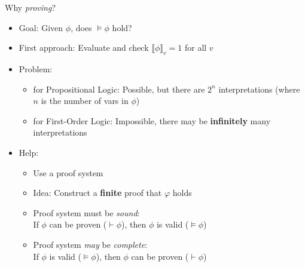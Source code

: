 \begin{frame}{Why \textit{proving}?}
\begin{itemize}
	\item Goal: Given $\phi$, does $\vDash \phi$ hold?
	\item First approach:
	Evaluate and check $\llbracket \phi \rrbracket_v = 1$ for all $v$

	\pause

	\item Problem:
	\begin{itemize}
		\item for Propositional Logic: Possible, but there are $2^n$ interpretations (where $n$ is the number of vars in $\phi$)
		\item for First-Order Logic: Impossible, there may be \textbf{infinitely} many interpretations
	\end{itemize}

	\pause

	\item Help:
	\begin{itemize}
		\item Use a proof system
		\item Idea: Construct a \textbf{finite} proof that $φ$ holds\\[1em]
		\item Proof system must be \textit{sound}: \\
		If $\phi$ can be proven ($\vdash \phi$), then $\phi$ is valid \hspace{3.1em}($\vDash \phi$)\\[1em]
		\item Proof system \textit{may} be \textit{complete}:\\
		If $\phi$ is valid \hspace{2.8em} ($\vDash \phi$), then $\phi$ can be proven ($\vdash \phi$)
	\end{itemize}
\end{itemize}
\end{frame}


